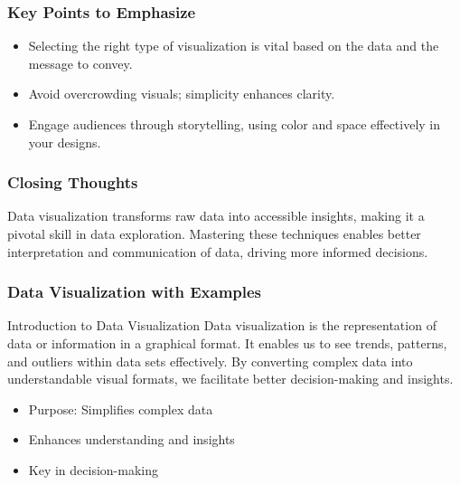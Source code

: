 \documentclass[aspectratio=169]{beamer}
\begin{document}
\begin{frame}[fragile]
    \frametitle{Key Points to Emphasize}
    \begin{itemize}
        \item Selecting the right type of visualization is vital based on the data and the message to convey.
        \item Avoid overcrowding visuals; simplicity enhances clarity.
        \item Engage audiences through storytelling, using color and space effectively in your designs.
    \end{itemize}
\end{frame}

\begin{frame}[fragile]
    \frametitle{Closing Thoughts}
    Data visualization transforms raw data into accessible insights, making it a pivotal skill in data exploration. Mastering these techniques enables better interpretation and communication of data, driving more informed decisions.
\end{frame}

\begin{frame}[fragile]
    \frametitle{Data Visualization with Examples}
    \begin{block}{Introduction to Data Visualization}
        Data visualization is the representation of data or information in a graphical format. It enables us to see trends, patterns, and outliers within data sets effectively. 
        By converting complex data into understandable visual formats, we facilitate better decision-making and insights.
    \end{block}
    \begin{itemize}
        \item Purpose: Simplifies complex data
        \item Enhances understanding and insights
        \item Key in decision-making
    \end{itemize}
\end{frame}
\end{document}
